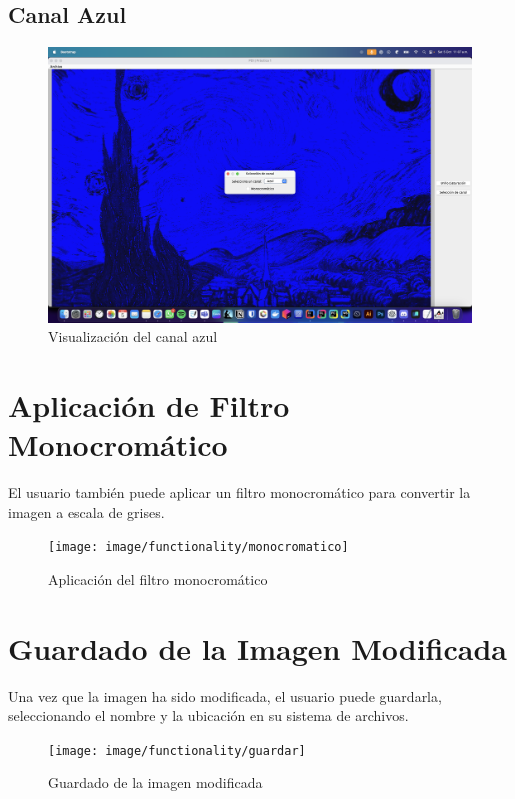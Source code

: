 \documentclass{report}
\begin{document}
  \subsection{Canal Azul}\label{subsec:canal-azul}
  \begin{figure}[H]
    \centering
    \includegraphics[width=\textwidth]{image/functionality/canal-azul}
    \caption{Visualización del canal azul}\label{fig:canal-azul}
  \end{figure}


  \section{Aplicación de Filtro Monocromático}\label{sec:aplicacion-de-filtro-monocromatico}
  El usuario también puede aplicar un filtro monocromático para convertir la imagen a escala de grises.

  \begin{figure}[H]
    \centering
    \texttt{[image: image/functionality/monocromatico]}
    \caption{Aplicación del filtro monocromático}\label{fig:monocromatico}
  \end{figure}


  \section{Guardado de la Imagen Modificada}\label{sec:guardado-de-la-imagen-modificada}
  Una vez que la imagen ha sido modificada, el usuario puede guardarla, seleccionando el nombre y la ubicación en su sistema de archivos.

  \begin{figure}[H]
    \centering
    \texttt{[image: image/functionality/guardar]}
    \caption{Guardado de la imagen modificada}\label{fig:guardar}
  \end{figure}
\end{document}
